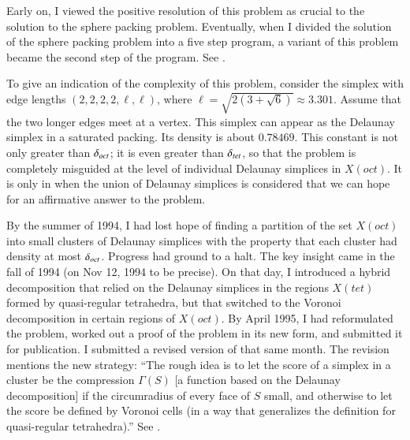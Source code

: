 Early on, I viewed the positive resolution of this problem as
crucial to the solution to the sphere packing problem.  Eventually,
when I divided the solution of the sphere packing problem into a five step
program, a variant of this problem became the second step of the
program. See \cite{part2}.

To give an indication of the complexity of this problem, consider
the simplex with edge lengths $(2,2,2,2,\ell,\ell)$, where $\ell =
\sqrt{2 (3 + \sqrt6)}\approx 3.301$.  Assume that the two longer
edges meet at a vertex.  This simplex can appear as the Delaunay
simplex in a saturated packing.  Its density is about $0.78469$.
This constant is not only greater than $\delta_{oct}$; it is even greater
than $\delta_{tet}$, so that the problem is completely misguided at the
level of individual Delaunay simplices in $X(oct)$.  It is only in
when the union of Delaunay simplices is considered that we can
hope for an affirmative answer to the problem.

By the summer of 1994, I had lost hope of finding a partition of
the set $X(oct)$ into small clusters of Delaunay simplices with
the property that each cluster had density at most $\delta_{oct}$.
Progress had ground to a halt.   The key insight came in the fall
of 1994 (on Nov 12, 1994 to be precise). On that day, I introduced
a hybrid decomposition that relied on the Delaunay simplices in
the regions $X(tet)$ formed by quasi-regular tetrahedra, but that
switched to the Voronoi decomposition in certain regions of
$X(oct)$. By April 1995, I had reformulated the problem, worked
out a proof of the problem \cite{part2} in its new form, and
submitted it for publication. I submitted a revised version of
\cite{part1} that same month.  The revision mentions the new
strategy: ``The rough idea is to let the score of a simplex in a
cluster be the compression $\Gamma(S)$ [a function based on the
Delaunay decomposition] if the circumradius of every face of $S$
small, and otherwise to let the score be defined by Voronoi cells
(in a way that generalizes the definition for quasi-regular
tetrahedra).'' See \cite[p.6]{part1}.

